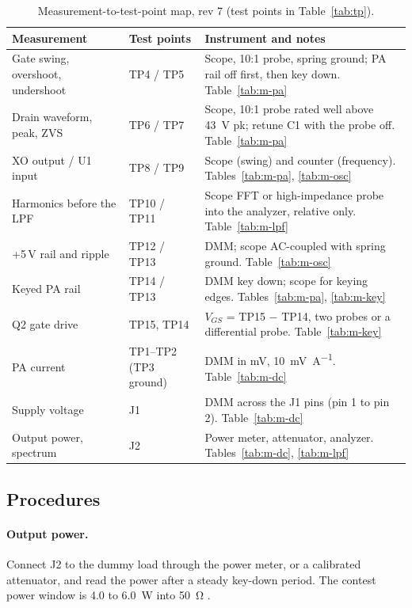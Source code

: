 \documentclass[11pt,letterpaper]{article}
\begin{document}
\begin{table}[H]\centering\small
\caption{Measurement-to-test-point map, rev 7 (test points in Table~\ref{tab:tp}).}\label{tab:tpmap}
\begin{tabularx}{\textwidth}{@{}L{4.6cm}L{2.6cm}Y@{}}
\toprule Measurement & Test points & Instrument and notes \\ \midrule
Gate swing, overshoot, undershoot & TP4 / TP5 & Scope, 10:1 probe, spring ground; PA rail off first, then key down. Table~\ref{tab:m-pa} \\
Drain waveform, peak, ZVS & TP6 / TP7 & Scope, 10:1 probe rated well above \SI{43}{\volt} pk; retune C1 with the probe off. Table~\ref{tab:m-pa} \\
XO output / U1 input & TP8 / TP9 & Scope (swing) and counter (frequency). Tables~\ref{tab:m-pa}, \ref{tab:m-osc} \\
Harmonics before the LPF & TP10 / TP11 & Scope FFT or high-impedance probe into the analyzer, relative only. Table~\ref{tab:m-lpf} \\
+5\,V rail and ripple & TP12 / TP13 & DMM; scope AC-coupled with spring ground. Table~\ref{tab:m-osc} \\
Keyed PA rail & TP14 / TP13 & DMM key down; scope for keying edges. Tables~\ref{tab:m-pa}, \ref{tab:m-key} \\
Q2 gate drive & TP15, TP14 & $V_{GS}$ = TP15 $-$ TP14, two probes or a differential probe. Table~\ref{tab:m-key} \\
PA current & TP1--TP2 (TP3 ground) & DMM in mV, \SI{10}{\milli\volt\per\ampere}. Table~\ref{tab:m-dc} \\
Supply voltage & J1 & DMM across the J1 pins (pin 1 to pin 2). Table~\ref{tab:m-dc} \\
Output power, spectrum & J2 & Power meter, attenuator, analyzer. Tables~\ref{tab:m-dc}, \ref{tab:m-lpf} \\
\bottomrule
\end{tabularx}
\end{table}

\subsection{Procedures}
\paragraph{Output power.} Connect J2 to the dummy load through the power meter, or a calibrated attenuator, and read the power after a steady key-down period. The contest power window is 4.0 to \SI{6.0}{\watt} into \SI{50}{\ohm} \cite{qrparci9611}.
\end{document}
